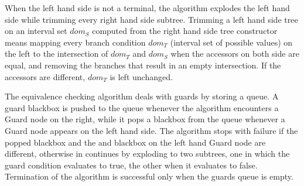\documentclass[12pt]{article}
\begin{document}
When the left hand side is not a terminal, the algorithm explodes the
left hand side while trimming every right hand side subtree. Trimming
a left hand side tree on an interval set $dom_S$ computed from the right hand
side tree constructor means mapping every branch condition $dom_T$ (interval set of
possible values) on the left to the intersection of $dom_T$ and $dom_S$ when
the accessors on both side are equal, and removing the branches that
result in an empty intersection. If the accessors are different,
\emph{$dom_T$} is left unchanged.

The equivalence checking algorithm deals with guards by storing a
queue. A guard blackbox is pushed to the queue whenever the algorithm
encounters a Guard node on the right, while it pops a blackbox from
the queue whenever a Guard node appears on the left hand side.
The algorithm stops with failure if the popped blackbox and the and
blackbox on the left hand Guard node are different, otherwise in
continues by exploding to two subtrees, one in which the guard
condition evaluates to true, the other when it evaluates to false.
Termination of the algorithm is successful only when the guards queue
is empty.
\end{document}
